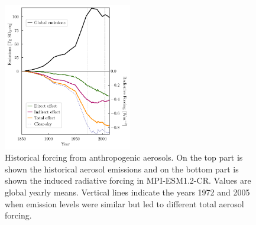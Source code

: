 \documentclass[draft]{agujournal2019}
\begin{document}
      \begin{figure}
            \centering
            \noindent\includegraphics[width=0.5\textwidth]{../../figures/figure1}
            \caption{Historical forcing from anthropogenic aerosols. On the top part is shown the historical aerosol emissions and on the bottom part is shown the induced radiative forcing in MPI-ESM1.2-CR. Values are global yearly means. Vertical lines indicate the years 1972 and 2005 when emission levels were similar but led to different total aerosol forcing.}
            \label{fig:figure1}
      \end{figure}
\end{document}
